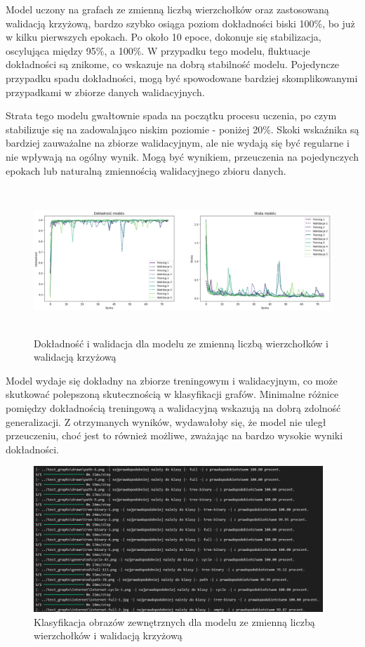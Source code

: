 Model uczony na grafach ze zmienną liczbą wierzchołków oraz zastosowaną walidacją krzyżową,
bardzo szybko osiąga poziom dokładności biski 100\%, bo już w kilku pierwszych epokach.
Po około 10 epoce, dokonuje się stabilizacja, oscylująca między 95\%, a 100\%.
W przypadku tego modelu, fluktuacje dokładności są znikome, co wskazuje na dobrą stabilność modelu.
Pojedyncze przypadku spadu dokładności, mogą być spowodowane bardziej skomplikowanymi
przypadkami w zbiorze danych walidacyjnych.

Strata tego modelu gwałtownie spada na początku procesu uczenia,
po czym stabilizuje się na zadowalająco niskim poziomie - poniżej 20\%.
Skoki wskaźnika są bardziej zauważalne na zbiorze walidacyjnym,
ale nie wydają się być regularne i nie wpływają na ogólny wynik.
Mogą być wynikiem, przeuczenia na pojedynczych epokach lub naturalną zmiennością walidacyjnego zbioru danych.

\begin{figure}[ht]
	\centering
	\includegraphics[height=5.5cm]{resources/tests/images/v3/multiple_edges_crossvalid_img.png}
	\caption{Dokładność i walidacja dla modelu ze zmienną liczbą wierzchołków i walidacją krzyżową}
	\label{Fig:tests-csvar-0a}
\end{figure}
\FloatBarrier

Model wydaje się dokładny na zbiorze treningowym i walidacyjnym,
co może skutkować polepszoną skutecznością w klasyfikacji grafów.
Minimalne różnice pomiędzy dokładnością treningową a walidacyjną wskazują na dobrą zdolność generalizacji.
Z otrzymanych wyników, wydawałoby się, że model nie uległ przeuczeniu,
choć jest to również możliwe, zważając na bardzo wysokie wyniki dokładności. 

\begin{figure}[ht]
	\centering
	\includegraphics[height=5.5cm]{resources/tests/images/v3/multiple_edges_crossvalid_txt.png}
	\caption{Klasyfikacja obrazów zewnętrznych dla modelu ze zmienną liczbą wierzchołków i walidacją krzyżową}
	\label{Fig:tests-csvar-0b}
\end{figure}
\FloatBarrier

